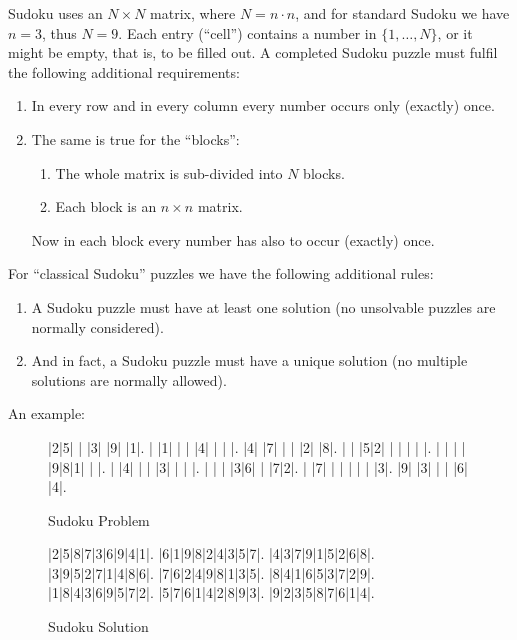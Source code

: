 \documentclass[11pt]{report}
\begin{document}
Sudoku uses an $N \times N$ matrix, where $N = n \cdot n$, and for standard Sudoku we have $n = 3$, thus $N = 9$. Each entry (``cell'') contains a number in $\{1, \dots, N\}$, or it might be empty, that is, to be filled out. A completed Sudoku puzzle must fulfil the following additional requirements:
\begin{enumerate}
\item In every row and in every column every number occurs only (exactly) once.
\item The same is true for the ``blocks'':
  \begin{enumerate}
  \item The whole matrix is sub-divided into $N$ blocks.
  \item Each block is an $n \times n$ matrix.
  \end{enumerate}
  Now in each block every number has also to occur (exactly) once.
\end{enumerate}
For ``classical Sudoku'' puzzles we have the following additional rules:
\begin{enumerate}
\item A Sudoku puzzle must have at least one solution (no unsolvable puzzles are normally considered).
\item And in fact, a Sudoku puzzle must have a unique solution (no multiple solutions are normally allowed).
\end{enumerate}
An example:

\setlength\sudokusize{8cm}
\begin{figure}
\begin{sudoku}
 |2|5| | |3| |9| |1|.
 | |1| | | |4| | | |.
 |4| |7| | | |2| |8|.
 | | |5|2| | | | | |.
 | | | | |9|8|1| | |.
 | |4| | | |3| | | |.
 | | | |3|6| | |7|2|.
 | |7| | | | | | |3|.
 |9| |3| | | |6| |4|.
\end{sudoku}
\caption{Sudoku Problem}
\end{figure}

\begin{figure}
\begin{sudoku}
  |2|5|8|7|3|6|9|4|1|.
  |6|1|9|8|2|4|3|5|7|.
  |4|3|7|9|1|5|2|6|8|.
  |3|9|5|2|7|1|4|8|6|.
  |7|6|2|4|9|8|1|3|5|.
  |8|4|1|6|5|3|7|2|9|.
  |1|8|4|3|6|9|5|7|2|.
  |5|7|6|1|4|2|8|9|3|.
  |9|2|3|5|8|7|6|1|4|.
\end{sudoku}
\caption{Sudoku Solution}
\end{figure}
\end{document}
